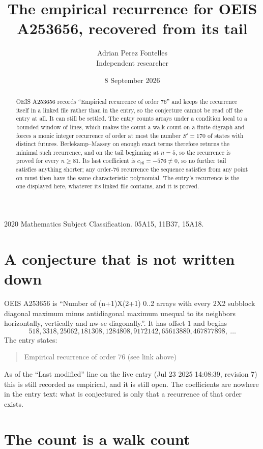 \documentclass[11pt,a4paper]{article}
\title{The empirical recurrence for OEIS A253656, recovered from its tail}
\author{Adrian Perez Fontelles\\ \small Independent researcher}
\date{8 September 2026}
\theoremstyle{plain}
\theoremstyle{definition}
\begin{document}
\maketitle

\begin{abstract}
OEIS A253656 records ``Empirical recurrence of order $76$'' and keeps the recurrence itself in
a linked file rather than in the entry, so the conjecture cannot be read off the entry at all.
It can still be settled. The entry counts arrays under a condition local to a bounded window of
lines, which makes the count a walk count on a finite digraph and forces a monic integer
recurrence of order at most the number $S'=170$ of states with distinct futures. Berlekamp--Massey on
enough exact terms therefore returns the minimal such recurrence, and on the tail beginning at $n=5$, so the recurrence is proved for every $n\ge81$.
Its last coefficient is $c_{76}=-576\neq0$, so no further tail satisfies anything
shorter; any order-$76$ recurrence the sequence satisfies from any point on must then have
the same characteristic polynomial. The entry's recurrence is the one displayed here, whatever
its linked file contains, and it is proved.
\end{abstract}

\noindent\small 2020 Mathematics Subject Classification. 05A15, 11B37, 15A18.\normalsize

\section{A conjecture that is not written down}

OEIS A253656 is ``Number of (n+1)X(2+1) 0..2 arrays with every 2X2 subblock diagonal maximum minus antidiagonal maximum unequal to its neighbors horizontally, vertically and nw-se diagonally.''. It has offset $1$ and begins
\[
518, 3318, 25062, 181308, 1284808, 9172142, 65613880, 467877898,\ \dots
\]
The entry states:
\begin{quote}
Empirical recurrence of order 76 (see link above)
\end{quote}
As of the ``Last modified'' line on the live entry (Jul 23 2025 14:08:39, revision 7)
this is still recorded as empirical, and it is still open. The coefficients are nowhere in the
entry text: what is conjectured is only that a recurrence of that order exists.

\section{The count is a walk count}
\end{document}
